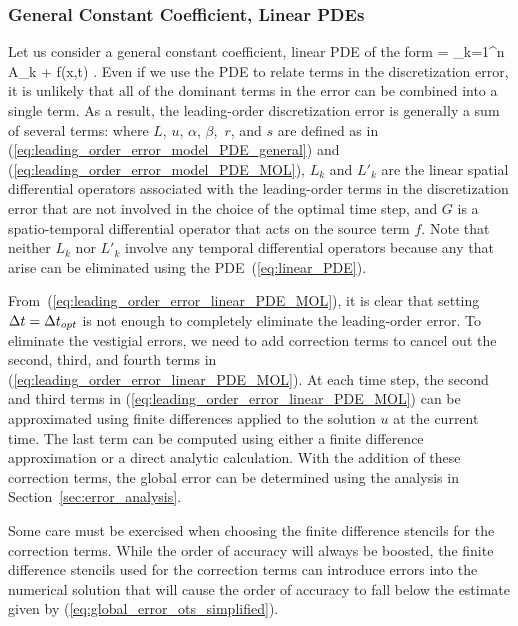 \documentclass[fleqn,12pt,twoside]{article}
\begin{document}
\subsubsection*{\label{sec:ots_linear_pde} 
            General Constant Coefficient, Linear PDEs} 
Let us consider a general constant coefficient, linear PDE of the form
\beq
   = 
  \sum_{k=1}^n A_k  + f(x,t)
  \label{eq:linear_PDE}.
\eeq
Even if we use the PDE to relate terms in the discretization error, it is
unlikely that all of the dominant terms in the error can be combined into 
a single term.   As a result, the leading-order discretization error is
generally a sum of several terms:
\beq
  \dt{}
  \label{eq:leading_order_error_linear_PDE_MOL}
\eeq
where $L$, $u$, $\alpha$, $\beta,$ $r$, and $s$ are defined as in
(\ref{eq:leading_order_error_model_PDE_general}) and
(\ref{eq:leading_order_error_model_PDE_MOL}), 
$L_k$ and $L'_k$ are the linear spatial differential operators associated 
with the leading-order terms in the discretization error that are not involved 
in the choice of the optimal time step, and $G$ is a spatio-temporal 
differential operator that acts on the source term $f$.  
Note that neither $L_k$ nor $L'_k$ involve any temporal differential 
operators because any that arise can be eliminated using the 
PDE~(\ref{eq:linear_PDE}).  

From~(\ref{eq:leading_order_error_linear_PDE_MOL}), it is clear that setting 
$\Delta t = \Delta t_{opt}$ is not enough to completely eliminate the 
leading-order error.  To eliminate the vestigial errors, we need to add 
correction terms to cancel out the second, third, and fourth terms in 
(\ref{eq:leading_order_error_linear_PDE_MOL}).  At each time step, the second 
and third terms in (\ref{eq:leading_order_error_linear_PDE_MOL}) can be 
approximated using finite differences applied to the solution $u$ at the 
current time.
The last term can be computed using either a finite difference approximation 
or a direct analytic calculation.  With the addition of these correction 
terms, the global error can be determined using the analysis in 
Section~\ref{sec:error_analysis}.

Some care must be exercised when choosing the finite difference 
stencils for the correction terms.  While the order of accuracy will always
be boosted, the finite difference stencils used for the correction terms
can introduce errors into the numerical solution that will cause the order
of accuracy to fall below the estimate given by 
(\ref{eq:global_error_ots_simplified}).
\end{document}
